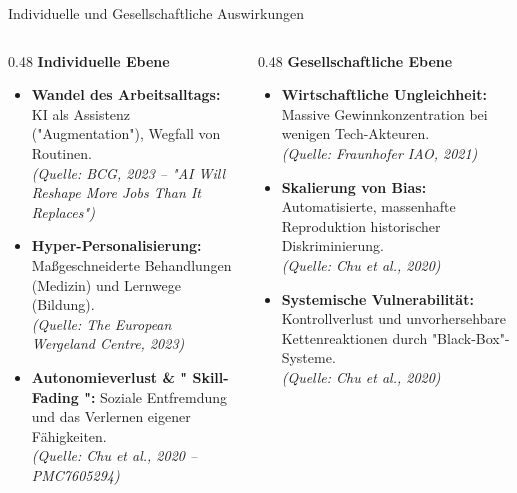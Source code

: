 \documentclass[aspectratio=169]{beamer}
\begin{document}
\begin{frame}[shrink]{Individuelle und Gesellschaftliche Auswirkungen}
    \begin{columns}[T]
        \begin{column}{0.48\textwidth}
            \textbf{Individuelle Ebene}
            \begin{itemize}
                \item \textbf{Wandel des Arbeitsalltags:} KI als Assistenz ("Augmentation"), Wegfall von Routinen. \\
                \tiny \textit{(Quelle: BCG, 2023 – "AI Will Reshape More Jobs Than It Replaces")} \small
                \item \textbf{Hyper-Personalisierung:} Maßgeschneiderte Behandlungen (Medizin) und Lernwege (Bildung). \\
                \tiny \textit{(Quelle: The European Wergeland Centre, 2023)} \small
                \item \textbf{Autonomieverlust \& " Skill-Fading ":} Soziale Entfremdung und das Verlernen eigener Fähigkeiten. \\
                \tiny \textit{(Quelle: Chu et al., 2020 – PMC7605294)} \small
            \end{itemize}
        \end{column}
        
        \begin{column}{0.48\textwidth}
            \textbf{Gesellschaftliche Ebene}
            \begin{itemize}
                \item \textbf{Wirtschaftliche Ungleichheit:} Massive Gewinnkonzentration bei wenigen Tech-Akteuren. \\
                \tiny \textit{(Quelle: Fraunhofer IAO, 2021)} \small
                \item \textbf{Skalierung von Bias:} Automatisierte, massenhafte Reproduktion historischer Diskriminierung. \\
                \tiny \textit{(Quelle: Chu et al., 2020)} \small
                \item \textbf{Systemische Vulnerabilität:} Kontrollverlust und unvorhersehbare Kettenreaktionen durch "Black-Box"-Systeme. \\
                \tiny \textit{(Quelle: Chu et al., 2020)} \small
            \end{itemize}
        \end{column}
    \end{columns}
\end{frame}
\end{document}
